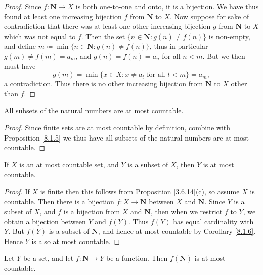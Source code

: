 \begin{proof}
    Since \(f : \mathbf{N} \to X\) is both one-to-one and onto, it is a bijection.
    We have thus found at least one increasing bijection \(f\) from \(\mathbf{N}\) to \(X\).
    Now suppose for sake of contradiction that there was at least one other increasing bijection \(g\) from \(\mathbf{N}\) to \(X\) which was not equal to \(f\).
    Then the set \(\{n \in \mathbf{N} : g(n) \neq f(n)\}\) is non-empty, and define \(m \coloneqq \min\{n \in \mathbf{N} : g(n) \neq f(n)\}\), thus in particular \(g(m) \neq f(m) = a_m\), and \(g(n) = f(n) = a_n\) for all \(n < m\).
    But we then must have
    \[
        g(m) = \min\{x \in X : x \neq a_t \text{ for all } t < m\} = a_m,
    \]
    a contradiction.
    Thus there is no other increasing bijection from \(\mathbf{N}\) to \(X\) other than \(f\).
\end{proof}

\begin{corollary}\label{8.1.6}
    All subsets of the natural numbers are at most countable.
\end{corollary}

\begin{proof}
    Since finite sets are at most countable by definition, combine with Proposition \ref{8.1.5} we thus have all subsets of the natural numbers are at most countable.
\end{proof}

\begin{corollary}\label{8.1.7}
    If \(X\) is an at most countable set, and \(Y\) is a subset of \(X\), then \(Y\) is at most countable.
\end{corollary}

\begin{proof}
    If \(X\) is finite then this follows from Proposition \ref{3.6.14}(c), so assume \(X\) is countable.
    Then there is a bijection \(f : X \to \mathbf{N}\) between \(X\) and \(\mathbf{N}\).
    Since \(Y\) is a subset of \(X\), and \(f\) is a bijection from \(X\) and \(\mathbf{N}\), then when we restrict \(f\) to \(Y\), we obtain a bijection between \(Y\) and \(f(Y)\).
    Thus \(f(Y)\) has equal cardinality with \(Y\).
    But \(f(Y)\) is a subset of \(\mathbf{N}\), and hence at most countable by Corollary \ref{8.1.6}.
    Hence \(Y\) is also at most countable.
\end{proof}

\begin{proposition}\label{8.1.8}
    Let \(Y\) be a set, and let \(f : \mathbf{N} \to Y\) be a function.
    Then \(f(\mathbf{N})\) is at most countable.
\end{proposition}

